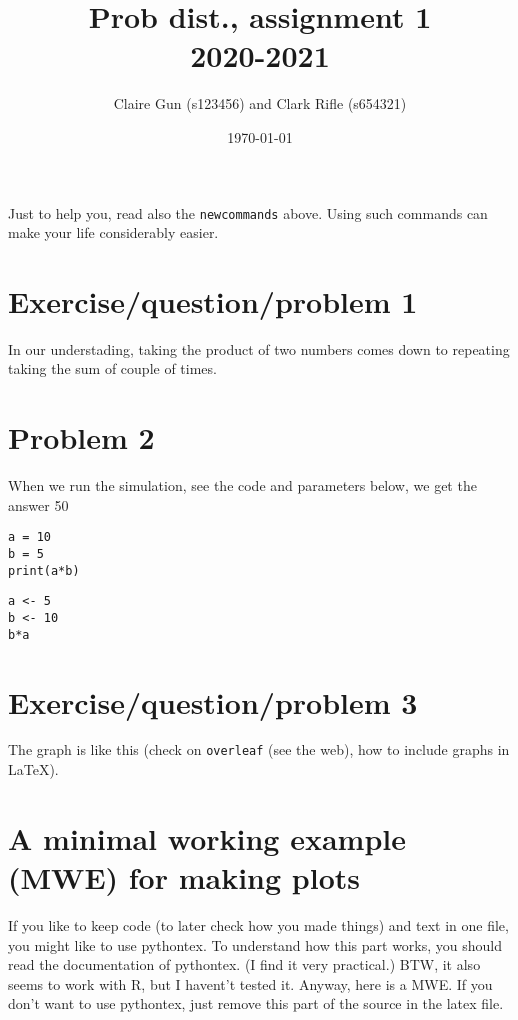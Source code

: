 \documentclass[a4paper,11pt]{article}
\author{Claire Gun (s123456) and Clark Rifle (s654321)}
\date{\today}
\title{Prob dist., assignment 1\\
  2020-2021
  }
\newcommand{\1}[1]{\,I_{#1}} %
\begin{document}
\maketitle

Just to help you, read also the \verb|newcommands| above. Using such commands can make your life considerably easier.

\section{Exercise/question/problem 1}

In our understading, taking the product of two numbers comes down to repeating taking the sum of couple of times.

\section{Problem 2}

When we run the simulation, see the code and parameters below, we get the answer 50

\begin{verbatim}
a = 10
b = 5
print(a*b)
\end{verbatim}


\begin{verbatim}
a <- 5
b <- 10
b*a
\end{verbatim}

\section{Exercise/question/problem 3}

The graph is like this (check on \texttt{overleaf} (see the web), how to include graphs in \LaTeX).


\section{A minimal working example (MWE) for making plots}
\label{sec:minim-work-example}

If you like to keep code (to later check how you made things) and text in one file, you might like to use pythontex. To understand how this part works, you should read the documentation of pythontex. (I find it very practical.)  BTW, it also seems to work with R, but I havent't tested it. Anyway, here is a MWE. If you don't want to use pythontex, just remove this part of the source in the latex file.
\end{document}

